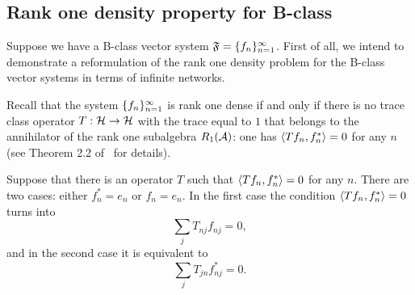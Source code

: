 \documentclass[12pt,oneside,a4paper]{amsart}
\begin{document}
    \medskip
    \subsection{Rank one density property for B-class}
      Suppose we have a B-class vector system $\fsys=\seq{f}$.
      First of all, we intend to demonstrate a reformulation of the rank one density problem for
        the B-class vector systems in terms of infinite networks.

      Recall that the system $\seq{f}$ is rank one dense
        if and only if there is no trace class operator $T: \cal{H} \to \cal{H}$ with the trace equal to $1$
        that belongs to the annihilator of the rank one subalgebra $R_1(\cal{A})$: one has $\inner{Tf_n}{f_n^*} = 0$ for any $n$
        (see Theorem 2.2 of~\cite{katavolos} for details).

      Suppose that there is an operator $T$ such that $\inner{Tf_n}{f_n^*} = 0$ for any $n$.
      There are two cases: either $f^*_n = e_n$ or $f_n = e_n$.
      In the first case the condition $\inner{Tf_n}{f_n^*} = 0$ turns into
      \begin{equation}
          \label{left-eqn}
          \sum_j T_{nj} f_{nj} = 0,
      \end{equation}
      and in the second case it is equivalent to
      \begin{equation}
          \label{right-eqn}
          \sum_j T_{jn} f^*_{nj} = 0.
      \end{equation}
\end{document}
